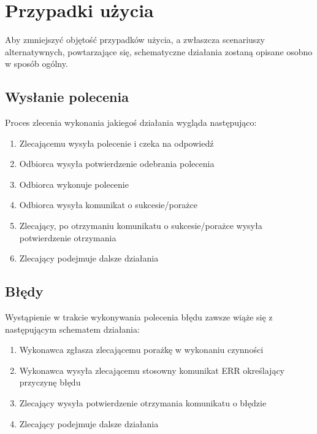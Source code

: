 \documentclass[10pt,a4paper]{article}
\begin{document}
    \section{Przypadki użycia}
        Aby zmniejszyć objętość przypadków użycia, a zwłaszcza scenariuszy alternatywnych, powtarzające się, schematyczne działania zostaną opisane osobno w sposób ogólny.                    
        
        \subsection{Wysłanie polecenia}
            Proces zlecenia wykonania jakiegoś działania wygląda następująco:
            
			\begin{enumerate}
	            \item Zlecającemu wysyła polecenie i czeka na odpowiedź
	            \item Odbiorca wysyła potwierdzenie odebrania polecenia
	            \item Odbiorca wykonuje polecenie
	            \item Odbiorca wysyła komunikat o sukcesie/porażce
	            \item Zlecający, po otrzymaniu komunikatu o sukcesie/porażce wysyła potwierdzenie otrzymania
	            \item Zlecający podejmuje dalsze działania 
			\end{enumerate} 
		 
        \subsection{Błędy}
            Wystąpienie w trakcie wykonywania polecenia błędu zawsze wiąże się z następującym schematem działania:
            
            \begin{enumerate}
	            \item Wykonawca zgłasza zlecającemu porażkę w wykonaniu czynności
	            \item Wykonawca wysyła zlecającemu stosowny komunikat ERR określający przyczynę błędu
	            \item Zlecający wysyła potwierdzenie otrzymania komunikatu o błędzie
	            \item Zlecający podejmuje dalsze działania  
            \end{enumerate}
            
\end{document}
